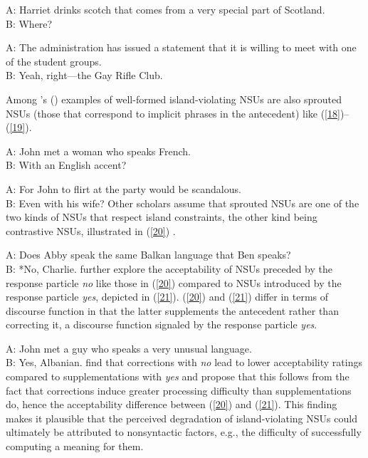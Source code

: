 {\ea A: Harriet drinks scotch that comes from a very special part of Scotland.\\B: Where? \citep[245]{CJ2005a} \label{16}\z

\ea A: The administration has issued a statement that it is willing to meet with one of the student groups.\\B: Yeah, right---the Gay Rifle Club. \citep[245]{CJ2005a} \label{17}\z

Among \citeauthor{CJ2005a}'s (\citeyear[245]{CJ2005a}) examples of well-formed island-violating NSUs are also sprouted NSUs (those that correspond to implicit phrases in the antecedent) like (\ref{18})--(\ref{19}).

\ea A: John met a woman who speaks French.\\B: With an English accent?\label{18}\z

\ea A: For John to flirt at the party would be scandalous. \\B: Even with his wife?\label{19}\z
Other scholars assume that sprouted NSUs are one of the two kinds of NSUs that respect island constraints, the other kind being contrastive NSUs, illustrated in (\ref{20}) \citep{Chung1995, Merchant2005a, Griffiths2014}.

\ea A: Does Abby speak the same Balkan language that Ben speaks?\\
B: *No, Charlie. \citep[688]{Merchant2005a}  \label{20}\z
%
\citet{Schmeh2015} further explore the acceptability of NSUs preceded by the response particle \textit{no} like those in (\ref{20}) compared to NSUs introduced by the response particle \textit{yes}, depicted in (\ref{21}). (\ref{20}) and (\ref{21}) differ in terms of discourse function in that the latter supplements the antecedent rather than correcting it, a discourse function signaled by the response particle \textit{yes}.

\ea A: John met a guy who speaks a very unusual language. \\B: Yes, Albanian. \citep[245]{CJ2005a} \label{21}\z
%
\citet{Schmeh2015} find that corrections with \textit{no} lead to
lower acceptability ratings compared to 
supplementations with \textit{yes} and propose that this follows from the fact that corrections induce greater processing difficulty than supplementations do, hence the acceptability difference between (\ref{20}) and (\ref{21}). This finding makes it plausible that the perceived degradation of island-violating NSUs could ultimately be attributed to nonsyntactic factors, e.g., the difficulty of successfully computing a meaning for them.

}
